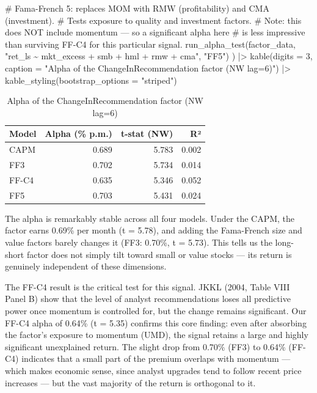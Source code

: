 \documentclass[
  letterpaper,
  DIV=11,
  numbers=noendperiod]{scrartcl}
\newenvironment{Shaded}{\begin{snugshade}}{\end{snugshade}}
\newcommand{\AttributeTok}[1]{\textcolor[rgb]{0.40,0.45,0.13}{#1}}
\newcommand{\CommentTok}[1]{\textcolor[rgb]{0.37,0.37,0.37}{#1}}
\newcommand{\DecValTok}[1]{\textcolor[rgb]{0.68,0.00,0.00}{#1}}
\newcommand{\FunctionTok}[1]{\textcolor[rgb]{0.28,0.35,0.67}{#1}}
\newcommand{\NormalTok}[1]{\textcolor[rgb]{0.00,0.23,0.31}{#1}}
\newcommand{\SpecialCharTok}[1]{\textcolor[rgb]{0.37,0.37,0.37}{#1}}
\newcommand{\StringTok}[1]{\textcolor[rgb]{0.13,0.47,0.30}{#1}}
\begin{document}
\begin{Shaded}
\begin{Highlighting}[]
  \CommentTok{\# Fama{-}French 5: replaces MOM with RMW (profitability) and CMA (investment).}
  \CommentTok{\# Tests exposure to quality and investment factors.}
  \CommentTok{\# Note: this does NOT include momentum — so a significant alpha here}
  \CommentTok{\# is less impressive than surviving FF{-}C4 for this particular signal.}
  \FunctionTok{run\_alpha\_test}\NormalTok{(factor\_data, }\StringTok{"ret\_ls \textasciitilde{} mkt\_excess + smb + hml + rmw + cma"}\NormalTok{, }\StringTok{"FF5"}\NormalTok{)}
\NormalTok{) }\SpecialCharTok{|\textgreater{}}
  \FunctionTok{kable}\NormalTok{(}\AttributeTok{digits =} \DecValTok{3}\NormalTok{,}
        \AttributeTok{caption =} \StringTok{"Alpha of the ChangeInRecommendation factor (NW lag=6)"}\NormalTok{) }\SpecialCharTok{|\textgreater{}}
  \FunctionTok{kable\_styling}\NormalTok{(}\AttributeTok{bootstrap\_options =} \StringTok{"striped"}\NormalTok{)}
\end{Highlighting}
\end{Shaded}

\begin{longtable}[t]{lrrr}
\caption{\label{tab:pricing-tests}Alpha of the ChangeInRecommendation factor (NW lag=6)}\\
\toprule
Model & Alpha (\% p.m.) & t-stat (NW) & R²\\
\midrule
CAPM & 0.689 & 5.783 & 0.002\\
FF3 & 0.702 & 5.734 & 0.014\\
FF-C4 & 0.635 & 5.346 & 0.052\\
FF5 & 0.703 & 5.431 & 0.024\\
\bottomrule
\end{longtable}

The alpha is remarkably stable across all four models. Under the CAPM,
the factor earns 0.69\% per month (t = 5.78), and adding the Fama-French
size and value factors barely changes it (FF3: 0.70\%, t = 5.73). This
tells us the long-short factor does not simply tilt toward small or
value stocks --- its return is genuinely independent of these
dimensions.

The FF-C4 result is the critical test for this signal. JKKL (2004, Table
VIII Panel B) show that the level of analyst recommendations loses all
predictive power once momentum is controlled for, but the change remains
significant. Our FF-C4 alpha of 0.64\% (t = 5.35) confirms this core
finding: even after absorbing the factor's exposure to momentum (UMD),
the signal retains a large and highly significant unexplained return.
The slight drop from 0.70\% (FF3) to 0.64\% (FF-C4) indicates that a
small part of the premium overlaps with momentum --- which makes
economic sense, since analyst upgrades tend to follow recent price
increases --- but the vast majority of the return is orthogonal to it.
\end{document}
